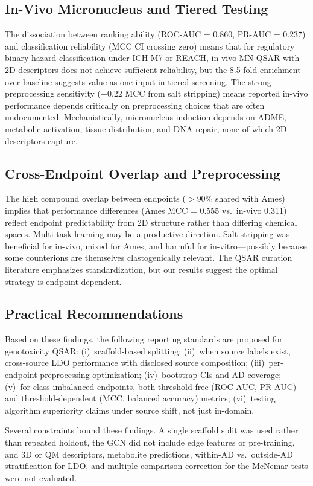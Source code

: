 \subsection{In-Vivo Micronucleus and Tiered Testing}

The dissociation between ranking ability (ROC-AUC = 0.860, PR-AUC = 0.237) and classification reliability (MCC CI crossing zero) means 
that for regulatory binary hazard classification under ICH M7\cite{ICH_M7_2017} or REACH,\cite{EU_REACH_2006} in-vivo MN QSAR with 2D descriptors does not achieve sufficient reliability,
but the 8.5-fold enrichment over baseline suggests value as one input in tiered screening.\cite{Dobo_2012} 
The strong preprocessing sensitivity ($+0.22$ MCC from salt stripping) means reported in-vivo performance depends critically on preprocessing choices 
that are often undocumented.\cite{Fourches_2016} Mechanistically, micronucleus induction depends on ADME, metabolic activation, tissue distribution, 
and DNA repair,\cite{Tweats_2007,Kirkland_2011} none of which 2D descriptors capture.

\subsection{Cross-Endpoint Overlap and Preprocessing}

The high compound overlap between endpoints ($>$90\% shared with Ames) implies that performance differences (Ames MCC = 0.555 vs.\ in-vivo 0.311) reflect endpoint predictability from 2D structure rather than 
differing chemical spaces.\cite{Tropsha_2010} Multi-task learning may be a productive direction.\cite{Ramsundar_2015} 
Salt stripping was beneficial for in-vivo, mixed for Ames, and harmful for in-vitro---possibly because some counterions are themselves clastogenically relevant. 
The QSAR curation literature\cite{Fourches_2010,Fourches_2016} emphasizes standardization, but our results suggest the optimal strategy is endpoint-dependent.

\subsection{Practical Recommendations}

Based on these findings, the following reporting standards are proposed for genotoxicity QSAR: 
(i)~scaffold-based splitting; 
(ii)~when source labels exist, cross-source LDO performance with disclosed source composition; 
(iii)~per-endpoint preprocessing optimization; 
(iv)~bootstrap CIs and AD coverage; (v)~for class-imbalanced endpoints, both threshold-free (ROC-AUC, PR-AUC) and threshold-dependent (MCC, balanced accuracy) metrics; 
(vi)~testing algorithm superiority claims under source shift, not just in-domain.

Several constraints bound these findings. A single scaffold split was used rather than repeated holdout, the GCN did not include edge features or pre-training,\cite{Hu_2020_pretrain} 
and 3D or QM descriptors, metabolite predictions, within-AD vs.\ outside-AD stratification for LDO, and multiple-comparison correction for the McNemar tests\cite{Demsar_2006} were not evaluated.
